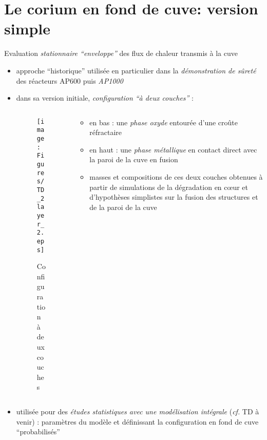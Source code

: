 \section{Le corium en fond de cuve: version simple}
\begin{frame}[fragile]
Evaluation \emph{stationnaire ``enveloppe''} des flux de chaleur transmis à la cuve
\begin{itemize}
\item approche ``historique'' utilisée en particulier dans la \emph{démonstration de sûreté} des réacteurs AP600 puis \emph{AP1000} \cite{Esmaili2004} 
\item dans sa version initiale, \emph{configuration ``à deux couches''} :
\begin{columns}[T]
    \begin{column}{0.35\textwidth}
      \begin{figure}[H]
\centering \texttt{[image: Figures/TD\_2layer\_2.eps]}
\caption{Configuration à deux couches}
      \end{figure}
    \end{column}
    \begin{column}{0.65\textwidth}
    \begin{itemize}
    \item en bas : une \emph{phase oxyde} entourée d'une croûte réfractaire 
    \item en haut : une \emph{phase métallique} en contact direct avec la paroi de la cuve en fusion
    \item masses et compositions de ces deux couches obtenues à partir de simulations de la dégradation en c\oe ur et d'hypothèses simplistes sur la fusion des structures et de la paroi de la cuve
    \end{itemize}
    \end{column}
\end{columns}
  \item utilisée pour des \emph{études statistiques avec une modélisation intégrale} (\textit{cf.} TD à venir) : paramètres du modèle et définissant la configuration en fond de cuve ``probabilisés'' 
\end{itemize}

\end{frame}
